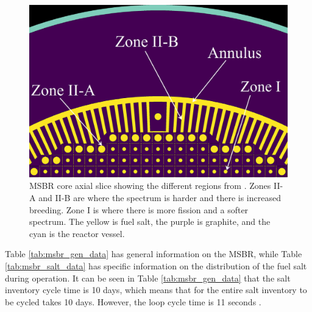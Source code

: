 \begin{figure}[H]
  \centering
  \includegraphics[scale=0.25]{images/msbr_ryk_1.PNG}
  \caption{MSBR core axial slice showing the different regions from \cite{rykhlevskii_modeling_2019}. Zones II-A and II-B are where the spectrum is harder and there is increased breeding. Zone I is where there is more fission and a softer spectrum. The yellow is fuel salt, the purple is graphite, and the cyan is the reactor vessel.}
   \label{fig:msbr_ryklev}
\end{figure}

Table \ref{tab:msbr_gen_data} has general information on the MSBR, while Table \ref{tab:msbr_salt_data} has specific information on the distribution of the fuel salt during operation. It can be seen in Table \ref{tab:msbr_gen_data} that the salt inventory cycle time is 10 days, which means that for the entire salt inventory to be cycled takes 10 days. However, the loop cycle time is 11 seconds \cite{robertson_conceptual_1971}.

